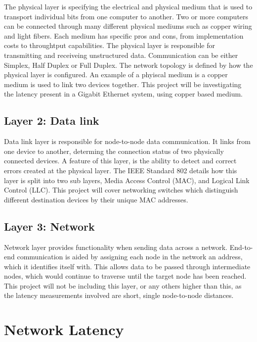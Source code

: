 \par The physical layer is specifying the electrical and physical medium that is used to transport individual bits from one computer to another.
Two or more computers can be connected through many different physical mediums such as copper wiring and light fibers. 
Each medium has specific pros and cons, from implementation costs to throughtput capabilities.
The physical layer is responsible for transmitting and receiveing unstructured data.
Communication can be either Simplex, Half Duplex or Full Duplex.
The network topology is defined by how the physical layer is configured.
An example of a phyiscal medium is a copper medium is used to link two devices together.
This project will be investigating the latency present in a Gigabit Ethernet system, using copper based medium.

\subsection{Layer 2: Data link}

\par Data link layer is responsible for node-to-node data communication. 
It links from one device to another, determing the connection status of two physically connected devices.
A feature of this layer, is the ability to detect and correct errors created at the physical layer.
The IEEE Standard 802 \cite{IEEE802} details how this layer is split into two sub layers, Media Access Control (MAC), and Logical Link Control (LLC).
This project will cover networking switches which distinguish different destination devices by their unique MAC addresses.

\subsection{Layer 3: Network}

\par Network layer provides functionality when sending data across a network.
End-to-end communication is aided by assigning each node in the network an address, which it identifies itself with.
This allows data to be passed through intermediate nodes, which would continue to traverse until the target node has been reached.
This project will not be including this layer, or any others higher than this, as the latency measurements involved are short, single node-to-node distances.

\section{Network Latency}

